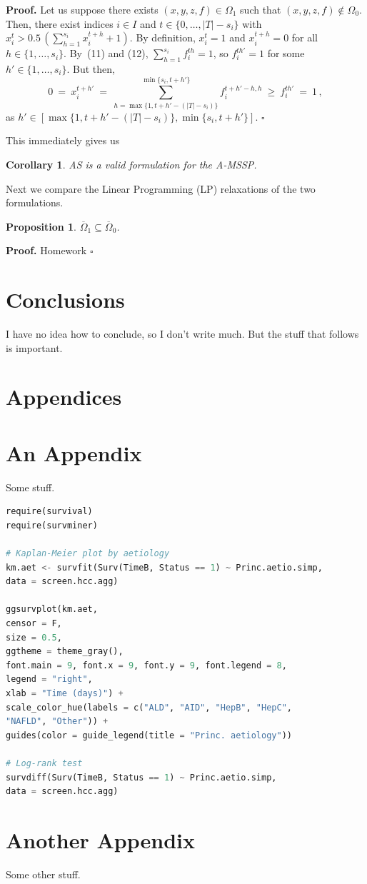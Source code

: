 \documentclass[11pt,twoside]{article}
\newtheorem{Corollary}{Corollary}
\newtheorem{Proposition}{Proposition}
\numberwithin{Theorem}{section}
\numberwithin{Definition}{section}
\numberwithin{Lemma}{section}
\numberwithin{Algorithm}{section}
\numberwithin{equation}{section}
\begin{document}
\noindent
\textbf{Proof.}
Let us suppose there exists $(x,y,z,f) \in \Omega_1$ such that $(x,y,z,f) \notin \Omega_0$.
Then, there exist indices $i \in I$ and $t \in \{0,\ldots,|T|-s_i\} $ with $x_i^t > \displaystyle 0.5\,\left( \sum_{h=1}^{s_i} x_i^{t+h} +1\right)$.
By definition, $x_i^t = 1$ and $x_i^{t+h} = 0$ for all $h \in \{1,\dots,s_i\}$. By~(11) and (12), $\displaystyle \sum_{h=1}^{s_i} f_i^{th}=1$, so $f_i^{th'}=1$ for some $h' \in \{1,\dots,s_i\}$.
But then,
\[ 0 \:=\: x_i^{t+h'} \:=\: \sum_{h=\max \{1, t+h'-(|T|-s_i)\}}^{\min\{s_i,t+h'\}} f_i^{t+h'-h,h} \:\ge\: f_i^{th'} \:=\: 1 \,,
\]
as $h' \in [\max \{1, t+h'-(|T|-s_i)\}, \min\{s_i,t+h'\}]$.
\hfill $\square$
\bigskip

\noindent
This immediately gives us
\begin{Corollary}
AS is a valid formulation for the A-MSSP.
\end{Corollary}

\noindent
Next we compare the Linear Programming (LP) relaxations of the two formulations.

\begin{Proposition}
$\overline{\Omega}_1 \subseteq  \overline{\Omega}_0 $.
\end{Proposition}

\noindent
\textbf{Proof.}
Homework
\hfill $\square$
\cleardoublepage


\section{Conclusions}
I have no idea how to conclude, so I don't write much. But the stuff that follows is important.
\clearpage


\clearpage

\appendix
\section*{Appendices}

\section{An Appendix}
\label{app:one}

Some stuff.

\begin{lstlisting}[language = Python]
require(survival)
require(survminer)

# Kaplan-Meier plot by aetiology
km.aet <- survfit(Surv(TimeB, Status == 1) ~ Princ.aetio.simp,
data = screen.hcc.agg)

ggsurvplot(km.aet,
censor = F,
size = 0.5,
ggtheme = theme_gray(),
font.main = 9, font.x = 9, font.y = 9, font.legend = 8,
legend = "right",
xlab = "Time (days)") +
scale_color_hue(labels = c("ALD", "AID", "HepB", "HepC",
"NAFLD", "Other")) +
guides(color = guide_legend(title = "Princ. aetiology"))

# Log-rank test
survdiff(Surv(TimeB, Status == 1) ~ Princ.aetio.simp,
data = screen.hcc.agg)

\end{lstlisting}

\clearpage

\section{Another Appendix}
\label{app:two}

Some other stuff.
\end{document}
